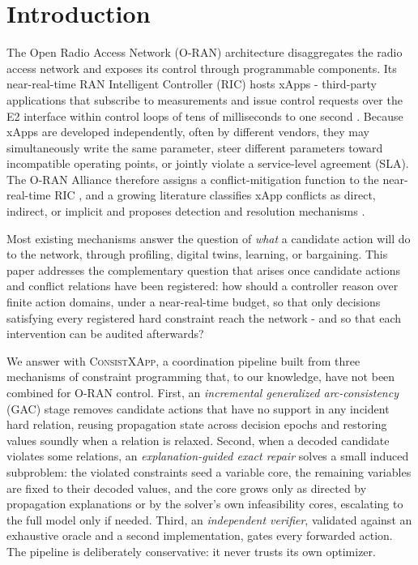 \documentclass[pdflatex,sn-mathphys-num,iicol,oneside]{sn-jnl}
\newcommand{\method}{\textsc{ConsistXApp}}
\begin{document}
\section{Introduction}
\label{sec:introduction}

The Open Radio Access Network (O-RAN) architecture disaggregates the
radio access network and exposes its control through programmable
components. Its near-real-time RAN Intelligent Controller (RIC) hosts
xApps - third-party applications that subscribe to measurements and
issue control requests over the E2 interface within control loops of
tens of milliseconds to one second \cite{polese2023oran}. Because
xApps are developed independently, often by different vendors, they
may simultaneously write the same parameter, steer different
parameters toward incompatible operating points, or jointly violate a
service-level agreement (SLA). The O-RAN Alliance therefore assigns a
conflict-mitigation function to the near-real-time RIC
\cite{oran2024conflict}, and a growing literature classifies xApp
conflicts as direct, indirect, or implicit and proposes detection and
resolution mechanisms \cite{adamczyk2023conflict,wadud2024qacm}.

Most existing mechanisms answer the question of \emph{what} a
candidate action will do to the network, through profiling, digital
twins, learning, or bargaining. This paper addresses the complementary
question that arises once candidate actions and conflict relations
have been registered: how should a controller reason over finite
action domains, under a near-real-time budget, so that only decisions
satisfying every registered hard constraint reach the network - and so
that each intervention can be audited afterwards?

We answer with \method, a coordination pipeline built from three
mechanisms of constraint programming that, to our knowledge, have not
been combined for O-RAN control. First, an \emph{incremental
generalized arc-consistency} (GAC) stage removes candidate actions
that have no support in any incident hard relation, reusing
propagation state across decision epochs and restoring values soundly
when a relation is relaxed. Second, when a decoded candidate violates
some relations, an \emph{explanation-guided exact repair} solves a
small induced subproblem: the violated constraints seed a variable
core, the remaining variables are fixed to their decoded values, and
the core grows only as directed by propagation explanations or by the
solver's own infeasibility cores, escalating to the full model only if
needed. Third, an \emph{independent verifier}, validated against an
exhaustive oracle and a second implementation, gates every forwarded
action. The pipeline is deliberately conservative: it never trusts its
own optimizer.
\end{document}
